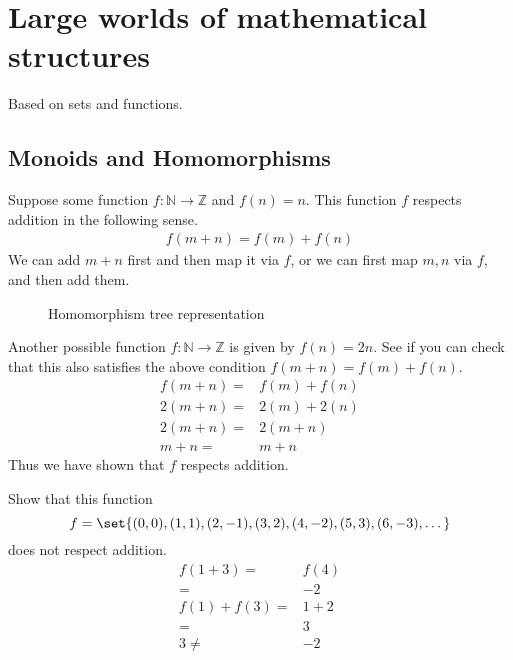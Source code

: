 \section{Large worlds of mathematical structures}
Based on sets and functions.
\subsection{Monoids and Homomorphisms}
Suppose some function $f: \mathbb{N} \rightarrow \mathbb{Z}$ and $f(n)=n$. This
function $f$ respects addition in the following sense.
\begin{align*}
	f(m+n) = f(m) + f(n)
\end{align*}
We can add $m+n$ first and then map it via $f$, or we can first map $m, n$ via
$f$, and then add them.
\begin{figure}[H]
	\begin{center}
		
	\end{center}
	\caption{Homomorphism tree representation}
\end{figure}

\begin{ttta}
	Another possible function $f: \mathbb{N} \rightarrow \mathbb{Z}$ is given by
	$f(n) = 2n$. See if you can check that this also satisfies the above condition
	$f(m+n) = f(m) + f(n)$.
	\begin{align*}
		f(m+n) = & f(m) + f(n) \\
		2(m+n) = & 2(m) + 2(n) \\
		2(m+n) = & 2(m+n)      \\
		m+n =    & m+n
	\end{align*}
	Thus we have shown that $f$ respects addition.
\end{ttta}

\begin{ttta}
	Show that this function
	\[
		f=\set{(0, 0), (1, 1), (2, -1), (3, 2), (4, -2), (5, 3), (6, -3), \dots}
	\]
	does not respect addition.
	\begin{align*}
		f(1+3) =      & f(4)  \\
		=             & -2    \\
		f(1) + f(3) = & 1 + 2 \\
		=             & 3     \\
		3 \neq        & -2    \\
	\end{align*}
\end{ttta}

